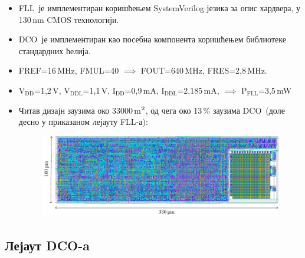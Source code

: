 \documentclass[aspectratio=169]{beamer}
\def \FLL  {FLL} %
\def \DCO  {DCO} %
\begin{document}
\begin{frame}{\secname}
	\begin{itemize}
		\item \FLL\ је имплементиран коришћењем SystemVerilog језика за опис хардвера, у 130\,nm CMOS технологији.
		\smallskip
		\item \DCO\ је имплементиран као посебна компонента коришћењем библиотеке стандардних ћелија. 
		\smallskip
		\item FREF=16\,MHz, FMUL=40 $\implies$ FOUT=640\,MHz, FRES=2,8\,MHz.
		\smallskip
		\item $\text{V}_\text{DD}$=1,2\,V, $\text{V}_\text{DDL}$=1,1\,V, $\text{I}_\text{DD}$=0,9\,mA, $\text{I}_\text{DDL}$=2,185\,mA, $\implies$ $\text{P}_\text{FLL}$=3,5\,mW		
		\smallskip
		\item Читав дизајн заузима око 33000\,\text\textmu m$^\text2$, од чега око 13\,\% заузима \DCO\ (доле десно у приказаном лејауту \FLL-а):
		\medskip
	   	\begin{figure}[!h]
  	    	    \centering
        	    \includegraphics[scale=0.7]{slike/prezentacija/layout_FLL.pdf}
    	        \end{figure}		
	\end{itemize}
\end{frame}

\subsection{Лејаут \DCO-a}
\end{document}
